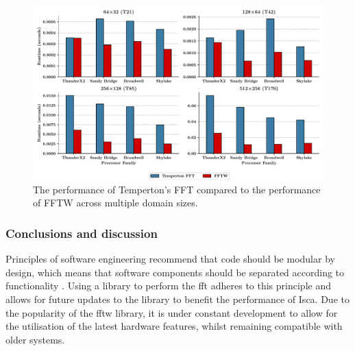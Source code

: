 \documentclass[a4paper,11pt]{report}
\begin{document}
\begin{figure}[H]
    \centering
    \includegraphics[width=1\textwidth]{img/compare_fft.pdf}
    \caption[Performance comparison of FFTW and Temperton's FFT]{The performance of Temperton's FFT compared to the performance of FFTW across multiple domain sizes.  }
    \label{fig:fft-times}
\end{figure}

\subsubsection{Conclusions and discussion}
Principles of software engineering recommend that code should be modular by design, which means that software components should be separated according to functionality \cite{parnas1972criteria}. Using a library to perform the \gls{fft} adheres to this principle and allows for future updates to the library to benefit the performance of Isca. Due to the popularity of the \gls{fftw} library, it is under constant development to allow for the utilisation of the latest hardware features, whilst remaining compatible with older systems. 
\par


%
%
%
\end{document}
